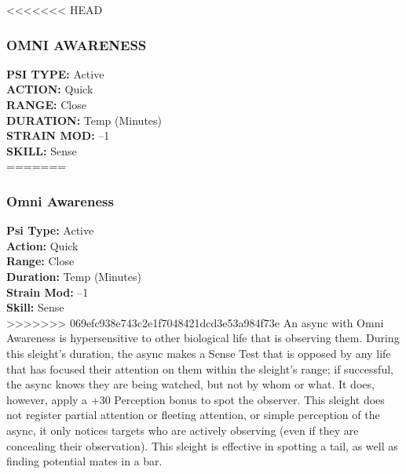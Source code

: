 <<<<<<< HEAD \subsubsection{OMNI AWARENESS} \textbf{PSI TYPE:} Active \\ \textbf{ACTION:} Quick \\ \textbf{RANGE:} Close \\ \textbf{DURATION:} Temp (Minutes) \\ \textbf{STRAIN MOD:} –1 \\ \textbf{SKILL:} Sense\\ ======= \subsubsection{Omni Awareness} \textbf{Psi Type:} Active \\ \textbf{Action:} Quick \\ \textbf{Range:} Close \\ \textbf{Duration:} Temp (Minutes) \\ \textbf{Strain Mod:} –1 \\ \textbf{Skill:} Sense\\ >>>>>>> 069efc938e743c2e1f7048421dcd3e53a984f73e An async with Omni Awareness is hypersensitive to other biological life that is observing them. During this sleight’s duration, the async makes a Sense Test that is opposed by any life that has focused their attention on them within the sleight’s range; if successful, the async knows they are being watched, but not by whom or what. It does, however, apply a +30 Perception bonus to spot the observer. This sleight does not register partial attention or fleeting attention, or simple perception of the async, it only notices targets who are actively observing (even if they are concealing their observation). This sleight is effective in spotting a tail, as well as finding potential mates in a bar. 

